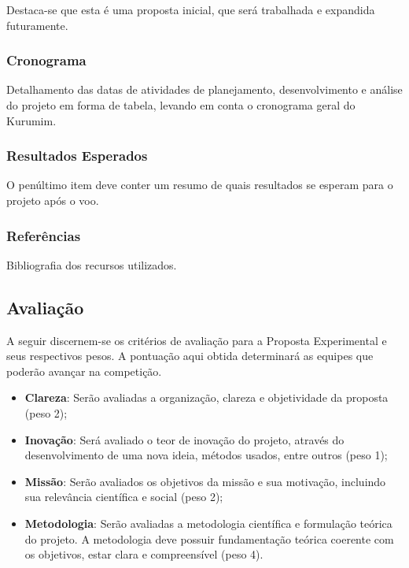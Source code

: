             Destaca-se que esta é uma proposta inicial, que será trabalhada e expandida futuramente.
            
        \subsubsection{Cronograma}
            Detalhamento das datas de atividades de planejamento, desenvolvimento e análise do 
            projeto em forma de tabela, levando em conta o cronograma geral do Kurumim.
                
        \subsubsection{Resultados Esperados}
            O penúltimo item deve conter um resumo de quais resultados se esperam para o projeto após o voo.
                    
        \subsubsection{Referências}
            Bibliografia dos recursos utilizados.

    \subsection{Avaliação}\label{sec:avaliacao_planejamento}
        A seguir discernem-se os critérios de avaliação para a Proposta Experimental e seus respectivos pesos. A pontuação aqui obtida determinará as equipes que poderão avançar na competição.
        
        \begin{itemize}
            \item \textbf{Clareza}: Serão avaliadas a organização, clareza e objetividade da proposta (peso 2);
            
            \item \textbf{Inovação}: Será avaliado o teor de inovação do projeto, através do desenvolvimento de uma nova ideia, métodos usados, entre outros (peso 1);
                     
            \item \textbf{Missão}: Serão avaliados os objetivos da missão e sua motivação, incluindo sua relevância científica e social (peso 2);
            
            \item \textbf{Metodologia}: Serão avaliadas a metodologia científica e formulação teórica do projeto. A metodologia deve possuir fundamentação teórica coerente com os objetivos, estar clara e compreensível (peso 4).
        \end{itemize}

